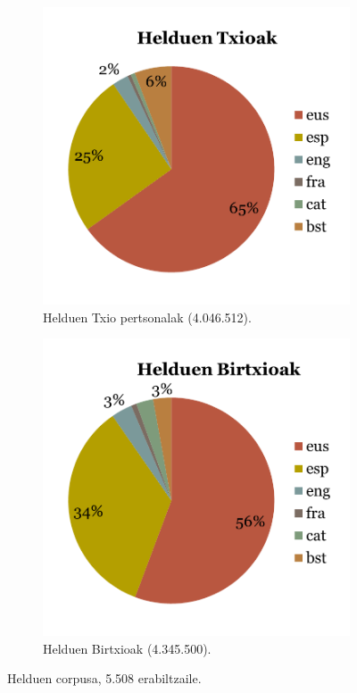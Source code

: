 \documentclass[information,article,submit,moreauthors,pdftex,10pt,a4paper]{Definitions/mdpi}
\begin{document}
\begin{figure}[H]
  \centering
  \begin{subfigure}[b]{0.48\linewidth}
    \includegraphics[width=\linewidth]{txio_heldu}
    \caption{Helduen Txio pertsonalak (4.046.512).}
  \end{subfigure}
  \begin{subfigure}[b]{0.48\linewidth}
    \includegraphics[width=\linewidth]{birtxio_heldu}
    \caption{Helduen Birtxioak (4.345.500).}
  \end{subfigure}
  \caption{Helduen corpusa, 5.508 erabiltzaile.}
  \label{fig:heldu txbtx}
\end{figure}
\end{document}
